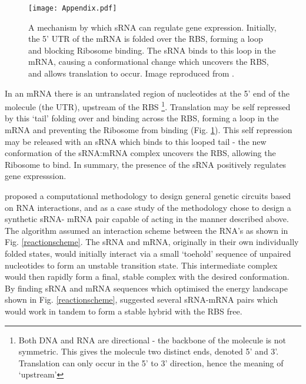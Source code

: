 \documentclass[10pt,journal]{./IEEE_latex_class/IEEEtran}
\begin{document}
\begin{figure}[H]
\centering
\texttt{[image: Appendix.pdf]}
\caption{A mechanism by which sRNA can regulate gene expression. Initially, the 5' UTR of the mRNA is folded over the RBS, forming a loop and blocking Ribosome binding. The sRNA binds to this loop in the mRNA, causing a conformational change which uncovers the RBS, and allows translation to occur. Image reproduced from \cite{Rodrigo2012}.}
\label{RBS}
\end{figure}

In an mRNA there is an untranslated region of nucleotides at the 5' end of the molecule (the UTR), upstream of the RBS \footnote{Both DNA and RNA are directional - the backbone of the molecule is not symmetric. This gives the molecule two distinct ends, denoted 5' and 3'. Translation can only occur in the 5' to 3' direction, hence the meaning of `upstream'}. Translation may be self repressed by this `tail' folding over and binding across the RBS, forming a  loop in the mRNA and preventing the Ribosome from binding (Fig. \ref{RBS}). This self repression may be released with an sRNA which binds to this looped tail - the new conformation of the sRNA:mRNA complex uncovers the RBS, allowing the Ribosome to bind. In summary, the presence of the sRNA positively regulates gene expresssion.


\cite{Rodrigo2012} proposed a computational methodology to design general genetic circuits based on RNA interactions, and as a case study of the methodology chose to design a synthetic sRNA- mRNA pair capable of acting in the manner described above. The algorithm assumed an interaction scheme between the RNA's as shown in Fig. \ref{reactionscheme}. The sRNA and mRNA, originally in their own individually folded states, would initially interact via a small 
`toehold' sequence of unpaired nucleotides to form an unstable transition state. This intermediate complex would then rapidly form a final, stable complex with the desired conformation. By finding sRNA and mRNA sequences which optimised the energy landscape shown in Fig. \ref{reactionscheme}, \cite{Rodrigo2012} suggested several sRNA-mRNA pairs which would work in tandem to form a stable hybrid with the RBS free. 
\end{document}
